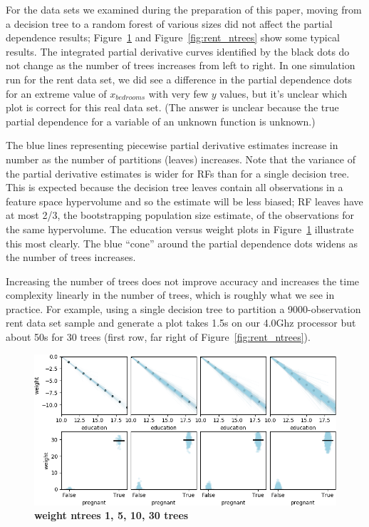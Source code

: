 \documentclass[12pt]{article}
\newcommand{\figref}[1]{Figure~\ref{#1}}
\begin{document}
For the data sets we examined during the preparation of this paper, moving from a decision tree to a random forest of various sizes did not affect the partial dependence results; \figref{fig:weight_ntrees} and \figref{fig:rent_ntrees} show some typical results. The integrated partial derivative curves identified by the black dots do not change as the number of trees increases from left to right.  In one simulation run for the rent data set, we did see a difference in the partial dependence dots for an extreme value of $x_{bedrooms}$ with very few $y$ values, but it's unclear which plot is correct for this real data set. (The answer is unclear because the true partial dependence for a variable of an unknown function is unknown.)

The blue lines representing piecewise partial derivative estimates increase in number as the number of partitions (leaves) increases.  Note that the variance of the partial derivative estimates is wider for RFs than for a single decision tree. This is expected because the decision tree leaves contain all observations in a feature space hypervolume and so the estimate will be less biased; RF leaves have at most 2/3, the bootstrapping population size estimate, of the observations for the same hypervolume. The education versus weight plots in \figref{fig:weight_ntrees} illustrate this most clearly. The blue ``cone'' around the partial dependence dots widens as the number of trees increases.  

Increasing the number of trees does not improve accuracy and increases the time complexity linearly in the number of trees, which is roughly what we see in practice.  For example, using a single decision tree to partition a 9000-observation rent data set sample and generate a plot takes 1.5s on our 4.0Ghz processor but about 50s for 30 trees (first row, far right of \figref{fig:rent_ntrees}).

\begin{figure}[htbp]
\begin{center}
\includegraphics[scale=0.5]{images/height_pregnant_vs_weight_ntrees.png}
\caption{{\bf  weight ntrees 1, 5, 10, 30 trees}}
\label{fig:weight_ntrees}
\end{center}
\end{figure}
\end{document}
